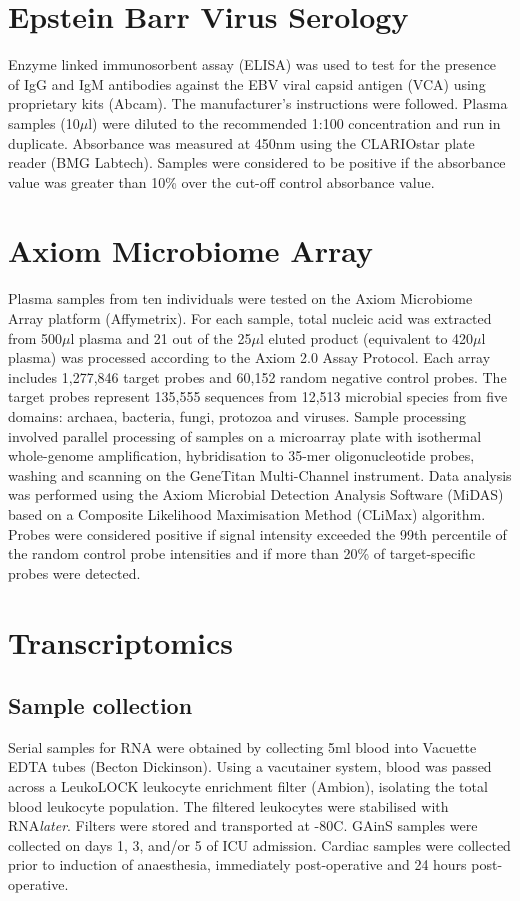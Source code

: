 \section{Epstein Barr Virus Serology}
Enzyme linked immunosorbent assay (ELISA) was used to test for the presence of IgG and IgM antibodies against the EBV viral capsid antigen (VCA) using proprietary kits (Abcam). The manufacturer's instructions were followed. Plasma samples (10$\mu$l) were diluted to the recommended 1:100 concentration and run in duplicate. Absorbance was measured at 450nm using the CLARIOstar plate reader (BMG Labtech). Samples were considered to be positive if the absorbance value was greater than 10\% over the cut-off control absorbance value. 

\section{Axiom Microbiome Array}
Plasma samples from ten individuals were tested on the Axiom Microbiome Array platform (Affymetrix). For each sample, total nucleic acid was extracted from 500$\mu$l plasma and 21 out of the 25$\mu$l eluted product (equivalent to 420$\mu$l plasma) was processed according to the Axiom 2.0 Assay Protocol. Each array includes 1,277,846 target probes and 60,152 random negative control probes. The target probes represent 135,555 sequences from 12,513 microbial species from five domains: archaea, bacteria, fungi, protozoa and viruses. Sample processing involved parallel processing of samples on a microarray plate with isothermal whole-genome amplification, hybridisation to 35-mer oligonucleotide probes, washing and scanning on the GeneTitan Multi-Channel instrument.  Data analysis was performed using the Axiom Microbial Detection Analysis Software (MiDAS) based on a Composite Likelihood Maximisation Method (CLiMax) algorithm. Probes were considered positive if signal intensity exceeded the 99th percentile of the random control probe intensities and if more than 20\% of target-specific probes were detected.  


\section{Transcriptomics}
\subsection{Sample collection}
Serial samples for RNA were obtained by collecting 5ml blood into Vacuette EDTA tubes (Becton Dickinson). Using a vacutainer system, blood was passed across a LeukoLOCK leukocyte enrichment filter (Ambion), isolating the total blood leukocyte population. The filtered leukocytes were stabilised with RNA\textit{later}. Filters were stored and transported at -80\degree C. GAinS samples were collected on days 1, 3, and/or 5 of ICU admission. Cardiac samples were collected prior to induction of anaesthesia, immediately post-operative and 24 hours post-operative.

